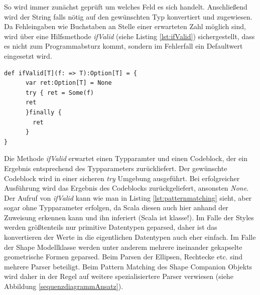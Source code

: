 So wird immer zunächst geprüft um welches Feld es sich handelt. Anschließend wird der String falls nötig auf den gewünschten Typ konvertiert und zugewiesen. Da Fehleingaben wie Buchstaben an Stelle einer erwarteten Zahl möglich sind, wird über eine Hilfsmethode \textit{ifValid} (siehe Listing \ref{lst:ifValid}) sichergestellt, dass es nicht zum Programmabsturz kommt, sondern im Fehlerfall ein Defaultwert eingesetzt wird.
\begin{lstlisting}[style=scala, caption = {Auszug aus dem Code Methode ifValid}, label = {lst:ifValid}]
def ifValid[T](f: => T):Option[T] = {
      var ret:Option[T] = None
      try { ret = Some(f)
      ret
      }finally {
        ret
      }
}
\end{lstlisting}Die Methode \textit{ifValid} erwartet einen Typparamter und einen Codeblock, der ein Ergebnis entsprechend des Typparameters zurückliefert. Der gewünschte Codeblock wird in einer sicheren \textit{try} Umgebung ausgeführt. Bei erfolgreicher Ausführung wird das Ergebnis des Codeblocks zurückgeliefert, ansonsten \textit{None}.
Der Aufruf von \textit{ifValid} kann wie man in Listing \ref{lst:patternmatching} sieht, aber sogar ohne Typparameter erfolgen, da Scala diesen auch hier anhand der Zuweisung erkennen kann und ihn inferiert (Scala ist klasse!).
Im Falle der Styles werden größtenteils nur primitive Datentypen geparsed, daher ist das konvertieren der Werte in die eigentlichen Datentypen auch eher einfach.
Im Falle der Shape Modellklasse werden unter anderem mehrere ineinander gekapselte geometrische Formen geparsed. Beim Parsen der Ellipsen, Rechtecke etc. sind mehrere Parser beteiligt. Beim Pattern Matching des Shape Companion Objekts wird daher in der Regel auf weitere spezialisiertere Parser verwiesen (siehe Abbildung \ref{sequenzdiagrammAnsatz}).


